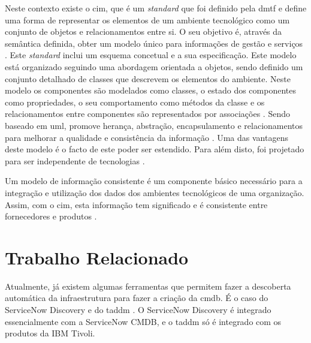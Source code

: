 \documentclass[
  oneside,
  11pt, a4paper,
  footinclude=true,
  headinclude=true,
  cleardoublepage=empty
]{scrbook}
\begin{document}
Neste contexto existe o \gls{cim}, que é um \textit{standard} que foi definido pela \gls{dmtf} \cite{cmdbsystems} e define uma forma de representar os elementos de um ambiente tecnológico como um conjunto de objetos e relacionamentos entre si. O seu objetivo é, através da semântica definida, obter um modelo único para informações de gestão e serviços \cite{cimoverview}. Este \textit{standard} inclui um esquema concetual e a sua especificação. Este modelo está organizado seguindo uma abordagem orientada a objetos, sendo definido um conjunto detalhado de classes que descrevem os elementos do ambiente. Neste modelo os componentes são modelados como classes, o estado dos componentes como propriedades, o seu comportamento como métodos da classe e os relacionamentos entre componentes são representados por associações \cite{cim}. Sendo baseado em \gls{uml}, promove herança, abstração, encapsulamento e relacionamentos para melhorar a qualidade e consistência da informação \cite{cimoverview}. Uma das vantagens deste modelo é o facto de este poder ser estendido. Para além disto, foi projetado para ser independente de tecnologias \cite{cimoverview}. 

Um modelo de informação consistente é um componente básico necessário para a integração e utilização dos dados dos ambientes tecnológicos de uma organização. Assim, com o \gls{cim}, esta informação tem significado e é consistente entre fornecedores e produtos \cite{cimoverview}.


\section{Trabalho Relacionado}

Atualmente, já existem algumas ferramentas que permitem fazer a descoberta automática da infraestrutura para fazer a criação da \gls{cmdb}. É o caso do ServiceNow Discovery \cite{servicenowdiscovery} e do \gls{taddm} \cite{taddmsite}. O ServiceNow Discovery é integrado essencialmente com a ServiceNow CMDB, e o \gls{taddm} só é integrado com os produtos da IBM Tivoli.
\end{document}
